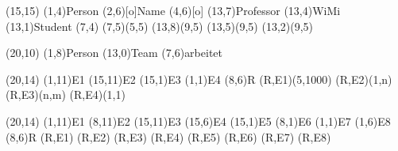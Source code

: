 \documentclass[a4paper,11pt]{article}
\begin{document}
\setlength{\unitlength}{.6cm}
\begin{schema}(15,15)
  \entity(1,4){Person}
  \attr(2,6)[o]{Name}
  \attr(4,6)[o]{}
  \relation(13,7){Professor}
  \relation(13,4){WiMi}
  \relation(13,1){Student}
  \cluster(7,4)
  \connection(7,5)(5,5){}
  \connection(13,8)(9,5){}
  \connection(13,5)(9,5){}
  \connection(13,2)(9,5){}
\end{schema}


\begin{schema}(20,10)
  \entity(1,8){Person}
  \entity(13,0){Team}
  \relation(7,6){arbeitet}
\end{schema}

\begin{schema}(20,14)
  \entity(1,11){E1}
  \entity(15,11){E2}
  \entity(15,1){E3}
  \entity(1,1){E4}
  \relation(8,6){R}
  \conn(R,E1){(5,1000)}
  \conn(R,E2){(1,n)}
  \conn(R,E3){(n,m)}
  \conn(R,E4){(1,1)}
\end{schema}

\begin{schema}(20,14)
  \entity(1,11){E1}
  \entity(8,11){E2}
  \entity(15,11){E3}
  \entity(15,6){E4}
  \entity(15,1){E5}
  \entity(8,1){E6}
  \entity(1,1){E7}
  \entity(1,6){E8}
  \relation(8,6){R}
  \conn(R,E1){}
  \conn(R,E2){}
  \conn(R,E3){}
  \conn(R,E4){}
  \conn(R,E5){}
  \conn(R,E6){}
  \conn(R,E7){}
  \conn(R,E8){}
\end{schema}
\end{document}
